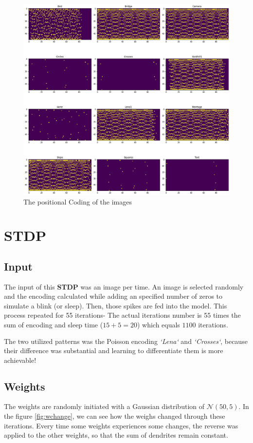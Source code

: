 \documentclass{article}
\begin{document}
	\begin{figure}[h]
		\includegraphics[width=1.2\textwidth]{images_pos.png}
		\caption{The positional Coding of the images}
		\label{impos}
	\end{figure}
	
	\section{STDP}
	\subsection{Input}
	The input of this \textbf{STDP} was an image per time. An image is selected randomly and the encoding calculated while adding an specified number of zeros to simulate a blink (or sleep). Then, those spikes are fed into the model. This process repeated for 55 iterations- The actual iterations number is 55 times the sum of encoding and sleep time ($15 + 5 = 20$) which equals $1100$ iterations.
	
	The two utilized patterns was the Poisson encoding \textit{`Lena`} and \textit{`Crosses`}, because their difference was substantial and learning to differentiate them is more achievable!
	
	\subsection{Weights}
	The weights are randomly initiated with a Gaussian distribution of $\mathcal{N}(50, 5)$. In the figure \ref{fig:wchange}, we can see how the weighs changed through these iterations. Every time some weights experiences some changes, the reverse was applied to the other weights, so that the sum of dendrites remain constant.
	
\end{document}

